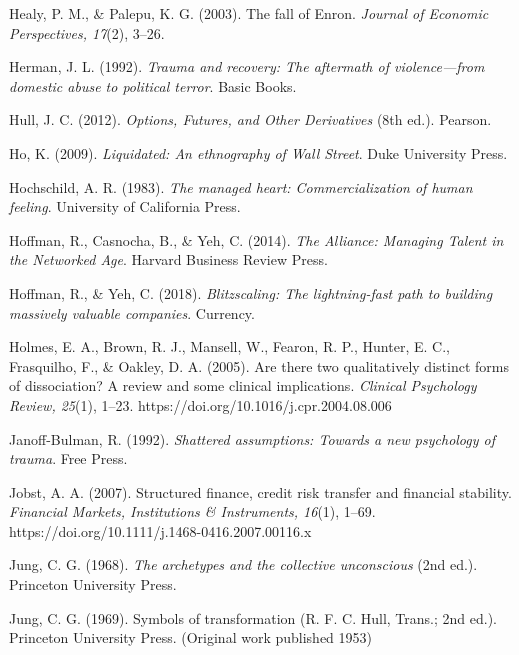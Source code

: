 \begin{thebibliography}{}
    Healy, P. M., \& Palepu, K. G. (2003). The fall of Enron. \textit{Journal of Economic Perspectives, 17}(2), 3–26.

    Herman, J. L. (1992). \textit{Trauma and recovery: The aftermath of violence—from domestic abuse to political terror}. Basic Books.

    Hull, J. C. (2012). \textit{Options, Futures, and Other Derivatives} (8th ed.). Pearson.

    Ho, K. (2009). \textit{Liquidated: An ethnography of Wall Street}. Duke University Press.

    Hochschild, A. R. (1983). \textit{The managed heart: Commercialization of human feeling}. University of California Press.

    Hoffman, R., Casnocha, B., \& Yeh, C. (2014). \textit{The Alliance: Managing Talent in the Networked Age}. Harvard Business Review Press.

    Hoffman, R., \& Yeh, C. (2018). \textit{Blitzscaling: The lightning-fast path to building massively valuable companies}. Currency.

    Holmes, E. A., Brown, R. J., Mansell, W., Fearon, R. P., Hunter, E. C., Frasquilho, F., \& Oakley, D. A. (2005). Are there two qualitatively distinct forms of dissociation? A review and some clinical implications. \textit{Clinical Psychology Review, 25}(1), 1–23. https://doi.org/10.1016/j.cpr.2004.08.006



    Janoff-Bulman, R. (1992). \textit{Shattered assumptions: Towards a new psychology of trauma}. Free Press.

    Jobst, A. A. (2007). Structured finance, credit risk transfer and financial stability. \textit{Financial Markets, Institutions \& Instruments, 16}(1), 1–69. https://doi.org/10.1111/j.1468-0416.2007.00116.x

    Jung, C. G. (1968). \textit{The archetypes and the collective unconscious} (2nd ed.). Princeton University Press.

    Jung, C. G. (1969). Symbols of transformation (R. F. C. Hull, Trans.; 2nd ed.). Princeton University Press. (Original work published 1953)


\end{thebibliography}
